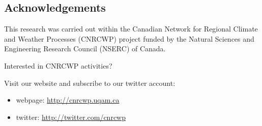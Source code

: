 \documentclass[a0,landscape]{a0poster}
\begin{document}
\begin{multicols*}{4}
\section*{Acknowledgements}
This research was carried out within the Canadian Network for Regional Climate and Weather Processes (CNRCWP) project funded by the Natural Sciences and Engineering Research Council (NSERC) of Canada.

\vfill
\begin{tcolorbox}[colback=red!5!white,colframe=red!75!black,title=Additional information]
Interested in CNRCWP activities?

Visit our website and subscribe to our twitter account:
\tcblower
\begin{itemize}
  \item webpage: \href{http://cnrcwp.uqam.ca}{http://cnrcwp.uqam.ca}
  \item twitter: \href{http://twitter.com/cnrcwp}{http://twitter.com/cnrcwp}
\end{itemize}
\end{tcolorbox}
%



\end{multicols*}
\end{document}
